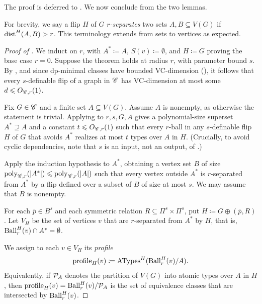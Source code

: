 The proof is deferred to . We now conclude  from the two lemmas.

\thmClosures*

For brevity, we say a flip $H$ of $G$ \emph{$r$-separates} two sets $A, B\subseteq V(G)$ if $\mathrm{dist}^H(A,B)>r$.
This terminology extends from sets to vertices as expected. 

\begin{proof}[Proof of ]
    We induct on $r$, with $A^*\coloneqq A$, $S(v)\coloneqq \emptyset$, and $H\coloneqq G$ proving the base case $r=0$. 
    Suppose the theorem holds at radius $r$, with parameter bound $s$. 
    By , and since dp-minimal classes have bounded VC-dimension (), it follows that
    every $s$-definable flip of a graph in $\mathscr C$ has VC-dimension at most some $d\leqslant O_{\mathscr C,r}(1)$.

    Fix $G\in\mathscr C$ and a finite set $A\subseteq V(G)$. Assume $A$ is nonempty, as otherwise the statement is trivial.
    Applying  to $r,s,G,A$ gives a polynomial-size superset $A^*\supseteq A$ and a constant $t \leqslant O_{\mathscr C,r}(1)$ such that every $r$-ball in any $s$-definable flip $H$ of $G$ that avoids $A^*$ realizes at most $t$ types over $A$ in $H$.
    (Crucially, to avoid cyclic dependencies, note that $s$ is an input, not an output, of .)

    Apply the induction hypothesis to $A^*$, obtaining a vertex set $B$ of size $\mathrm{poly}_{\mathscr C,r}(|A^*|)\leqslant\mathrm{poly}_{\mathscr C,r}(|A|)$ such that every vertex outside $A^*$ is $r$-separated from $A^*$ by a flip defined over a subset of $B$ of size at most $s$. We may assume that $B$ is nonempty.


    For each $\bar p\in B^s$ and each symmetric relation $R\subseteq\Pi^{s}\times\Pi^{s}$, put $H\coloneqq G\oplus(\bar p,R)$.
    Let $V_H$ be the set of vertices $v$ that are $r$-separated from $A^*$ by $H$, that is, $\operatorname{Ball}_r^H(v)\cap A^*=\emptyset$.

    We assign to each $v \in V_H$ its \emph{profile}
    \[
        \mathrm{profile}_H(v) \coloneqq \mathrm{ATypes}^H(\operatorname{Ball}_r^H(v)/A).
    \]
Equivalently,
if  $\mathcal P_A$ denotes the partition of $V(G)$ into atomic types over $A$ in $H$,
then $\mathrm{profile}_H(v)=
\operatorname{Ball}_r^H(v)/\mathcal P_A$
is the set of equivalence classes that are intersected by $\operatorname{Ball}_r^H(v)$.



\end{proof}
